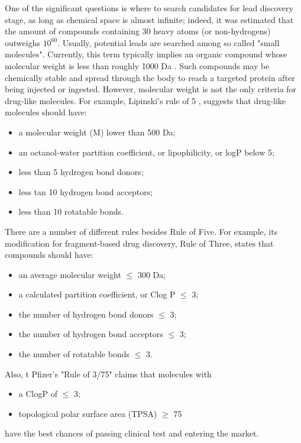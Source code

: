 One of the significant questions is where to search candidates for lead discovery stage, as long as chemical space is almost infinite; indeed, it was estimated {\cite{Bohacek1996ThePerspective}} that the amount of compounds containing 30 heavy atoms (or non-hydrogens) outweighs $10^{60}$.
Usually, potential leads are searched among so called "small molecules".
Currently, this term typically implies an organic compound whose molecular weight is less than roughly 1000 Da {\cite{Gilson2010AnUsers}}.
Such compounds may be chemically stable and spread through the body to reach a targeted protein after being injected or ingested.
However, molecular weight is not the only criteria for drug-like molecules.
For example, Lipinski's rule of 5 {\cite{Blass2015BasicDevelopment}}, suggests that drug-like molecules should have:
\begin{itemize}
    \item a molecular weight (M) lower than 500 Da;
    \item an octanol-water partition coefficient, or lipophilicity, or logP below 5;
    \item less than 5 hydrogen bond donors;
    \item less tan 10 hydrogen bond acceptors;
    \item less than 10 rotatable bonds.
\end{itemize}

There are a number of different rules besides Rule of Five. For example, its modification for fragment-based drug discovery, Rule of Three, states that 
compounds should have:
\begin{itemize} 
    \item an average molecular weight $\leq$ 300 Da;
    \item a calculated partition coefficient, or Clog P $\leq$ 3;
    \item the number of hydrogen bond donors $\leq$ 3;
    \item the number of hydrogen bond acceptors $\leq$ 3;
    \item the number of rotatable bonds $\leq$ 3.
\end{itemize}
Also, t Pfizer's "Rule of 3/75" claims that molecules with
\begin{itemize}
    \item a ClogP of $\leq$ 3;
    \item topological polar surface area (TPSA) $\ge$ 75
\end{itemize}
have the best chances of passing clinical test and entering the market.\\

